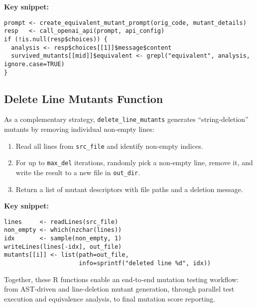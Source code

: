 \medskip
\noindent\textbf{Key snippet:}
\begin{verbatim}
prompt <- create_equivalent_mutant_prompt(orig_code, mutant_details)
resp   <- call_openai_api(prompt, api_config)
if (!is.null(resp$choices)) {
  analysis <- resp$choices[[1]]$message$content
  survived_mutants[[mid]]$equivalent <- grepl("equivalent", analysis, ignore.case=TRUE)
}
\end{verbatim}

\subsection{Delete Line Mutants Function}

As a complementary strategy, \texttt{delete\_line\_mutants} generates “string‐deletion” mutants by removing individual non‐empty lines:

\begin{enumerate}
  \item Read all lines from \texttt{src\_file} and identify non‐empty indices.  
  \item For up to \texttt{max\_del} iterations, randomly pick a non‐empty line, remove it, and write the result to a new file in \texttt{out\_dir}.  
  \item Return a list of mutant descriptors with file paths and a deletion message.
\end{enumerate}

\medskip
\noindent\textbf{Key snippet:}
\begin{verbatim}
lines     <- readLines(src_file)
non_empty <- which(nzchar(lines))
idx       <- sample(non_empty, 1)
writeLines(lines[-idx], out_file)
mutants[[i]] <- list(path=out_file,
                     info=sprintf("deleted line %d", idx))
\end{verbatim}

Together, these R functions enable an end‐to‐end mutation testing workflow: from AST‐driven and line‐deletion mutant generation, through parallel test execution and equivalence analysis, to final mutation score reporting.